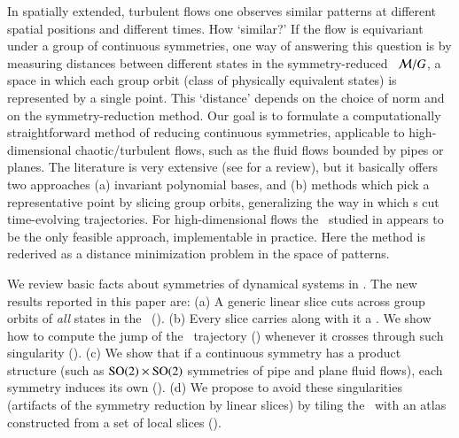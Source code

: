 

In spatially extended, turbulent flows one observes similar patterns at
different spatial positions and different times. How `similar?' If the
flow is equivariant under a group of continuous symmetries, one way of
answering this question is by measuring distances between different
states in the symmetry-reduced \statesp\ ${\cal M}/G$, a space in which
each group orbit (class of physically equivalent states) is represented
by a single point. This `distance' depends on the choice of norm and on
the symmetry-reduction method. Our goal is to formulate a computationally
straightforward method of reducing continuous symmetries, applicable to
high-dimensional chaotic/turbulent flows, such as the fluid flows bounded
by pipes or planes. The literature is very extensive (see
 for a review), but it basically offers two
approaches (a) invariant polynomial bases, and (b) methods which pick a
representative point by slicing group orbits, generalizing the way in
which {\PoincSec}s cut time-evolving trajectories. For high-dimensional
flows the \mslices\ studied in 
appears to be the only feasible approach, implementable in practice. Here
the method is rederived as a distance minimization problem in the space
of patterns.

We review basic facts
about symmetries of dynamical systems in .
The new results reported in this paper are:
    (a) A generic linear slice cuts across group orbits of {\em all}
        states in the \statesp\ ().
    (b) Every slice carries along with it a {\sset}. We show how to
        compute the jump of the \reducedsp\ trajectory
         () whenever it crosses
        through such singularity  ().
	(c) We show that if a continuous symmetry has a product structure
		(such as $\textrm{SO}(2) \times \textrm{SO}(2)$ symmetries of pipe and plane
		fluid flows), each symmetry induces its own {\sset}
		().
    (d) We propose to avoid these singularities (artifacts of the symmetry
        reduction by linear slices) by tiling the \statesp\ with an atlas
        constructed from a set of local slices  ().

